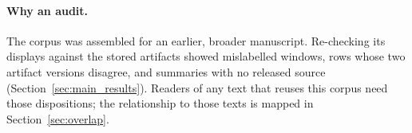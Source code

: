 \paragraph{Why an audit.}
The corpus was assembled for an earlier, broader manuscript. Re-checking its
displays against the stored artifacts showed mislabelled windows, rows whose
two artifact versions disagree, and summaries with no released source
(Section~\ref{sec:main_results}). Readers of any text that reuses this corpus
need those dispositions; the relationship to those texts is mapped in
Section~\ref{sec:overlap}.

